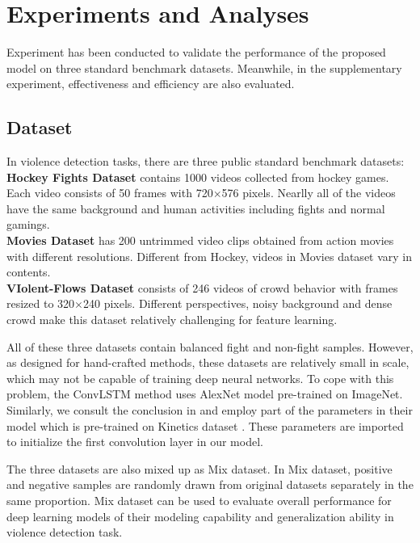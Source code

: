 \documentclass[10pt,twocolumn,letterpaper]{article}
\begin{document}

\section{Experiments and Analyses}
\label{sec:4}

Experiment has been conducted to validate the performance of the proposed model on three standard benchmark datasets.
Meanwhile, in the supplementary experiment, effectiveness and efficiency are also evaluated.

\subsection{Dataset}

In violence detection tasks, there are three public standard benchmark datasets: \\
\textbf{Hockey Fights Dataset} \cite{hockey} contains 1000 videos collected from hockey games.
Each video consists of 50 frames with 720$\times$576 pixels. Nearlly all of the videos have the same background and human activities including fights and normal gamings. \\
\textbf{Movies Dataset} \cite{hockey} has 200 untrimmed video clips obtained from action movies with different resolutions. Different from Hockey, videos in Movies dataset vary in contents.\\
\textbf{VIolent-Flows Dataset} \cite{vif} consists of 246 videos of crowd behavior with frames resized to 320$\times$240 pixels.
Different perspectives, noisy background and dense crowd make this dataset relatively challenging for feature learning.

All of these three datasets contain balanced fight and non-fight samples. 
However, as designed for hand-crafted methods, these datasets are relatively small in scale, which may not be capable of training deep neural networks.
To cope with this problem, the ConvLSTM method \cite{convlstm_sudh} uses AlexNet model pre-trained on ImageNet.
Similarly, we consult the conclusion in \cite{3dcnn_2} and employ part of the parameters in their model which is pre-trained on Kinetics dataset \cite{kinetics}.
These parameters are imported to initialize the first convolution layer in our model.

The three datasets are also mixed up as Mix dataset.
In Mix dataset, positive and negative samples are randomly drawn from original datasets separately in the same proportion.
Mix dataset can be used to evaluate overall performance for deep learning models of their modeling capability and generalization ability in violence detection task.
\end{document}
